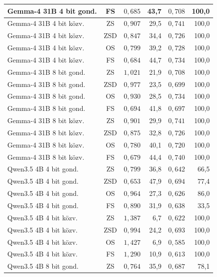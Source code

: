\documentclass[
]{elteikthesis}[2024/04/26]
\begin{document}
\begin{longtable}{ | l | c | r | r | r | r | }
	\hline
	Gemma-4 31B 4 bit gond. & FS & $0{,}685$ & 43,7 & $0{,}708$ & 100,0 \\
	\hline
	Gemma-4 31B 4 bit közv. & ZS & $0{,}907$ & 29,5 & $0{,}741$ & 100,0 \\
	\hline
	Gemma-4 31B 4 bit közv. & ZSD & $0{,}847$ & 34,4 & $0{,}726$ & 100,0 \\
	\hline
	Gemma-4 31B 4 bit közv. & OS & $0{,}799$ & 39,2 & $0{,}728$ & 100,0 \\
	\hline
	Gemma-4 31B 4 bit közv. & FS & $0{,}684$ & 44,7 & $0{,}734$ & 100,0 \\
	\hline
	Gemma-4 31B 8 bit gond. & ZS & $1{,}021$ & 21,9 & $0{,}708$ & 100,0 \\
	\hline
	Gemma-4 31B 8 bit gond. & ZSD & $0{,}977$ & 23,5 & $0{,}699$ & 100,0 \\
	\hline
	Gemma-4 31B 8 bit gond. & OS & $0{,}930$ & 28,5 & $0{,}734$ & 100,0 \\
	\hline
	Gemma-4 31B 8 bit gond. & FS & $0{,}694$ & 41,8 & $0{,}697$ & 100,0 \\
	\hline
	Gemma-4 31B 8 bit közv. & ZS & $0{,}901$ & 29,9 & $0{,}741$ & 100,0 \\
	\hline
	Gemma-4 31B 8 bit közv. & ZSD & $0{,}875$ & 32,8 & $0{,}726$ & 100,0 \\
	\hline
	Gemma-4 31B 8 bit közv. & OS & $0{,}780$ & 40,1 & $0{,}720$ & 100,0 \\
	\hline
	Gemma-4 31B 8 bit közv. & FS & $0{,}679$ & 44,4 & $0{,}740$ & 100,0 \\
	\hline
	Qwen3.5 4B 4 bit gond. & ZS & $0{,}799$ & 36,8 & $0{,}642$ & 66,5 \\
	\hline
	Qwen3.5 4B 4 bit gond. & ZSD & $0{,}653$ & 47,9 & $0{,}694$ & 77,4 \\
	\hline
	Qwen3.5 4B 4 bit gond. & OS & $0{,}964$ & 27,3 & $0{,}626$ & 86,0 \\
	\hline
	Qwen3.5 4B 4 bit gond. & FS & $0{,}890$ & 31,9 & $0{,}638$ & 33,5 \\
	\hline
	Qwen3.5 4B 4 bit közv. & ZS & $1{,}387$ & 6,7 & $0{,}622$ & 100,0 \\
	\hline
	Qwen3.5 4B 4 bit közv. & ZSD & $0{,}994$ & 24,2 & $0{,}693$ & 100,0 \\
	\hline
	Qwen3.5 4B 4 bit közv. & OS & $1{,}427$ & 6,9 & $0{,}585$ & 100,0 \\
	\hline
	Qwen3.5 4B 4 bit közv. & FS & $1{,}290$ & 10,9 & $0{,}613$ & 100,0 \\
	\hline
	Qwen3.5 4B 8 bit gond. & ZS & $0{,}764$ & 35,9 & $0{,}687$ & 78,1 \\

\end{longtable}
\end{document}
